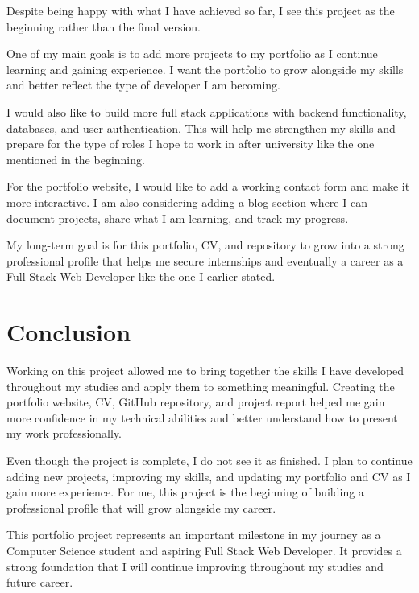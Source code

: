 \documentclass[12pt,a4paper]{article}
\begin{document}
Despite being happy with what I have achieved so far, I see this project as the beginning rather than the final version.

One of my main goals is to add more projects to my portfolio as I continue learning and gaining experience. I want the portfolio to grow alongside my skills and better reflect the type of developer I am becoming.

I would also like to build more full stack applications with backend functionality, databases, and user authentication. This will help me strengthen my skills and prepare for the type of roles I hope to work in after university like the one mentioned in the beginning.

For the portfolio website, I would like to add a working contact form and make it more interactive. I am also considering adding a blog section where I can document projects, share what I am learning, and track my progress.



My long-term goal is for this portfolio, CV, and repository to grow into a strong professional profile that helps me secure internships and eventually a career as a Full Stack Web Developer like the one I earlier stated.

\section{Conclusion}

Working on this project allowed me to bring together the skills I have developed throughout my studies and apply them to something meaningful. Creating the portfolio website, CV, GitHub repository, and project report helped me gain more confidence in my technical abilities and better understand how to present my work professionally.

Even though the project is complete, I do not see it as finished. I plan to continue adding new projects, improving my skills, and updating my portfolio and CV as I gain more experience. For me, this project is the beginning of building a professional profile that will grow alongside my career.

\begin{tcolorbox}[
colback=KimPink!5,
colframe=KimPink,
title=Final Reflection]

This portfolio project represents an important milestone in my journey as a Computer Science student and aspiring Full Stack Web Developer. It provides a strong foundation that I will continue improving throughout my studies and future career.

\end{tcolorbox}
\end{document}
